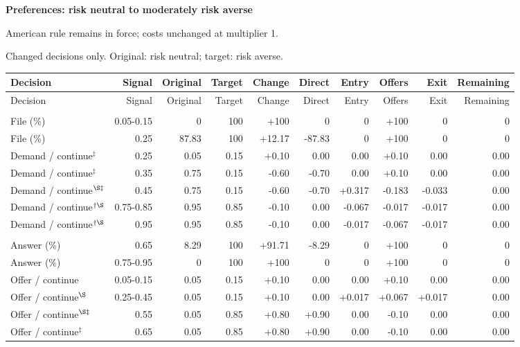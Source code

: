 \documentclass[10pt]{article}
\begin{document}
\clearpage
{\large\bfseries Preferences: risk neutral to moderately risk averse}\par
American rule remains in force; costs unchanged at multiplier 1.\par
{\small Changed decisions only. Original: risk neutral; target: risk averse.}\par
{\small\setlength{\tabcolsep}{3pt}\begin{longtable}{@{}>{\raggedright\arraybackslash}p{1.65in}rrrrrrrrr@{}}
\toprule Decision & Signal & Original & Target & Change & Direct & Entry & Offers & Exit & Remaining \\\midrule\endfirsthead
\toprule Decision & Signal & Original & Target & Change & Direct & Entry & Offers & Exit & Remaining \\\midrule\endhead
\bottomrule\endfoot
\multicolumn{10}{@{}l}{\textbf{Plaintiff}}\\
File (\%) & 0.05-0.15 & 0 & 100 & +100 & 0 & 0 & +100 & 0 & 0\\
File (\%) & 0.25 & 87.83 & 100 & +12.17 & -87.83 & 0 & +100 & 0 & 0\\
Demand / continue$^{\ddagger}$ & 0.25 & 0.05 & 0.15 & +0.10 & 0.00 & 0.00 & +0.10 & 0.00 & 0.00\\
Demand / continue$^{\ddagger}$ & 0.35 & 0.75 & 0.15 & -0.60 & -0.70 & 0.00 & +0.10 & 0.00 & 0.00\\
Demand / continue$^{\S\ddagger}$ & 0.45 & 0.75 & 0.15 & -0.60 & -0.70 & +0.317 & -0.183 & -0.033 & 0.00\\
Demand / continue$^{\dagger\S}$ & 0.75-0.85 & 0.95 & 0.85 & -0.10 & 0.00 & -0.067 & -0.017 & -0.017 & 0.00\\
Demand / continue$^{\dagger\S}$ & 0.95 & 0.95 & 0.85 & -0.10 & 0.00 & -0.017 & -0.067 & -0.017 & 0.00\\
\multicolumn{10}{@{}l}{\textbf{Defendant}}\\
Answer (\%) & 0.65 & 8.29 & 100 & +91.71 & -8.29 & 0 & +100 & 0 & 0\\
Answer (\%) & 0.75-0.95 & 0 & 100 & +100 & 0 & 0 & +100 & 0 & 0\\
Offer / continue & 0.05-0.15 & 0.05 & 0.15 & +0.10 & 0.00 & 0.00 & +0.10 & 0.00 & 0.00\\
Offer / continue$^{\S}$ & 0.25-0.45 & 0.05 & 0.15 & +0.10 & 0.00 & +0.017 & +0.067 & +0.017 & 0.00\\
Offer / continue$^{\S\ddagger}$ & 0.55 & 0.05 & 0.85 & +0.80 & +0.90 & 0.00 & -0.10 & 0.00 & 0.00\\
Offer / continue$^{\ddagger}$ & 0.65 & 0.05 & 0.85 & +0.80 & +0.90 & 0.00 & -0.10 & 0.00 & 0.00\\
\end{longtable}}
\end{document}
